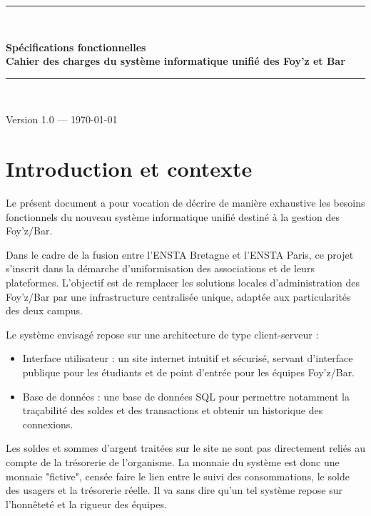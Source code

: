 \documentclass[a4paper,11pt]{article}
\begin{document}
\begin{titlepage}
    \centering
    \vspace*{\fill}
    \rule{\linewidth}{1.2pt} \\[0.4cm]
    {\huge \bfseries \color{enstablu} Spécifications fonctionnelles \\[0.3cm] Cahier des charges du système informatique unifié des Foy'z et Bar \par}
    \rule{\linewidth}{1.2pt} \\[1.5cm]
    
    \vspace*{\fill}
    {\large Version 1.0 --- \today \par}
\end{titlepage}

\clearpage
\tableofcontents
\clearpage


\section{Introduction et contexte}
Le présent document a pour vocation de décrire de manière exhaustive les besoins fonctionnels du nouveau système informatique unifié destiné à la gestion des Foy’z/Bar. 

Dans le cadre de la fusion entre l'ENSTA Bretagne et l'ENSTA Paris, ce projet s'inscrit dans la démarche d'uniformisation des associations et de leurs plateformes. L'objectif est de remplacer les solutions locales d'administration des Foy'z/Bar par une infrastructure centralisée unique, adaptée aux particularités des deux campus.

Le système envisagé repose sur une architecture de type client-serveur :
\begin{itemize}
    \item Interface utilisateur : un site internet intuitif et sécurisé, servant d'interface publique pour les étudiants et de point d'entrée pour les équipes Foy'z/Bar.
    \item Base de données : une base de données SQL pour permettre notamment la traçabilité des soldes et des transactions et obtenir un historique des connexions.
\end{itemize}

Les soldes et sommes d'argent traitées sur le site ne sont pas directement reliés au compte de la trésorerie de l'organisme. La monnaie du système est donc une monnaie "fictive", censée faire le lien entre le suivi des consommations, le solde des usagers et la trésorerie réelle. Il va sans dire qu'un tel système repose sur l'honnêteté et la rigueur des équipes.
\end{document}
